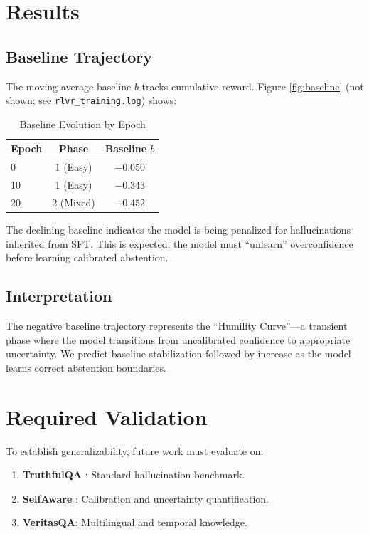 \documentclass{article}
\begin{document}
\section{Results}

\subsection{Baseline Trajectory}
The moving-average baseline $b$ tracks cumulative reward. Figure \ref{fig:baseline} (not shown; see \texttt{rlvr\_training.log}) shows:

\begin{table}[h]
\centering
\caption{Baseline Evolution by Epoch}
\label{tab:baseline}
\begin{tabular}{@{}lcc@{}}
\toprule
\textbf{Epoch} & \textbf{Phase} & \textbf{Baseline $b$} \\
\midrule
0 & 1 (Easy) & $-0.050$ \\
10 & 1 (Easy) & $-0.343$ \\
20 & 2 (Mixed) & $-0.452$ \\
\bottomrule
\end{tabular}
\end{table}

The declining baseline indicates the model is being penalized for hallucinations inherited from SFT. This is expected: the model must ``unlearn'' overconfidence before learning calibrated abstention.

\subsection{Interpretation}
The negative baseline trajectory represents the ``Humility Curve''---a transient phase where the model transitions from uncalibrated confidence to appropriate uncertainty. We predict baseline stabilization followed by increase as the model learns correct abstention boundaries.

\section{Required Validation}
To establish generalizability, future work must evaluate on:
\begin{enumerate}
    \item \textbf{TruthfulQA} \cite{Lin2022TruthfulQA}: Standard hallucination benchmark.
    \item \textbf{SelfAware} \cite{SelfAware2024}: Calibration and uncertainty quantification.
    \item \textbf{VeritasQA}: Multilingual and temporal knowledge.
\end{enumerate}
\end{document}
